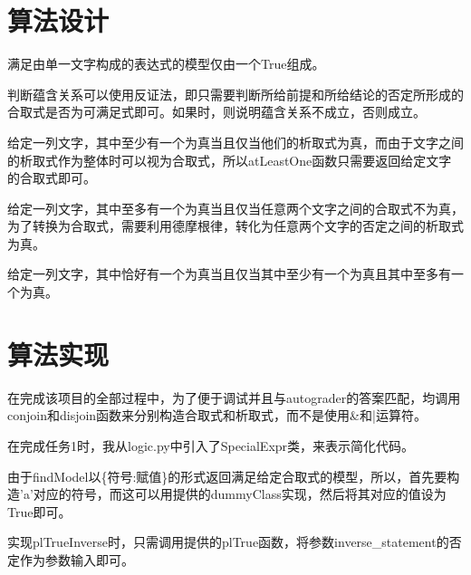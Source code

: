 %
%

\section{算法设计}
%
%
满足由单一文字构成的表达式的模型仅由一个True组成。

判断蕴含关系可以使用反证法，即只需要判断所给前提和所给结论的否定所形成的合取式是否为可满足式即可。如果时，则说明蕴含关系不成立，否则成立。

给定一列文字，其中至少有一个为真当且仅当他们的析取式为真，而由于文字之间的析取式作为整体时可以视为合取式，所以atLeastOne函数只需要返回给定文字的合取式即可。

给定一列文字，其中至多有一个为真当且仅当任意两个文字之间的合取式不为真，为了转换为合取式，需要利用德摩根律，转化为任意两个文字的否定之间的析取式为真。

给定一列文字，其中恰好有一个为真当且仅当其中至少有一个为真且其中至多有一个为真。
\section{算法实现}
在完成该项目的全部过程中，为了便于调试并且与autograder的答案匹配，均调用conjoin和disjoin函数来分别构造合取式和析取式，而不是使用\&和|运算符。

在完成任务1时，我从logic.py中引入了SpecialExpr类，来表示简化代码。

由于findModel以\{符号:赋值\}的形式返回满足给定合取式的模型，所以，首先要构造'a'对应的符号，而这可以用提供的dummyClass实现，然后将其对应的值设为True即可。

实现plTrueInverse时，只需调用提供的plTrue函数，将参数inverse\_statement的否定作为参数输入即可。

